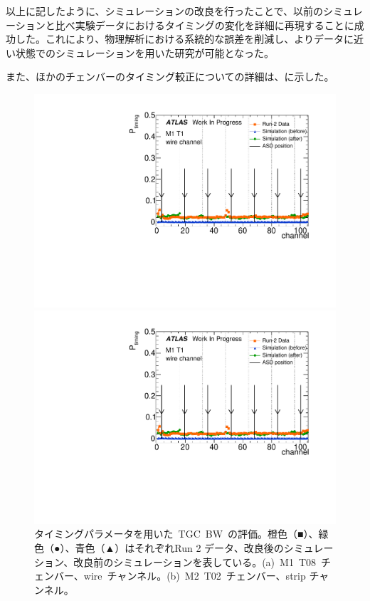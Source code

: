 以上に記したように、シミュレーションの改良を行ったことで、以前のシミュレーションと比べ実験データにおけるタイミングの変化を詳細に再現することに成功した。これにより、物理解析における系統的な誤差を削減し、よりデータに近い状態でのシミュレーションを用いた研究が可能となった。

また、ほかのチェンバーのタイミング較正についての詳細は、に示した。

\begin{figure}[H]
	\begin{minipage}{0.49\hsize}
	\centering
	\includegraphics[width=\textwidth,page=10]{img/pdf5/master_timingplot_comp.pdf}
	\subcaption{}
	\end{minipage}
	\begin{minipage}{0.49\hsize}
	\centering
	\includegraphics[width=\textwidth,page=13]{img/pdf5/master_timingplot_comp.pdf}
	\subcaption{}
	\end{minipage}
	\caption[タイミングパラメータを用いた~TGC~BW~の評価]{タイミングパラメータを用いた~TGC~BW~の評価。橙色（■）、緑色（●）、青色（▲）はそれぞれRun 2 データ、改良後のシミュレーション、改良前のシミュレーションを表している。(a)~M1~T08~チェンバー、wire~チャンネル。(b)~M2~T02~チェンバー、strip チャンネル。}
	\label{fig:timingPlotBW}
\end{figure}

